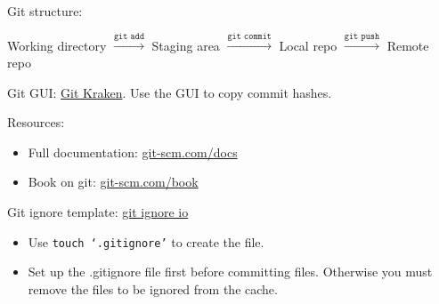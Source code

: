 \documentclass[12pt]{article}
\newcommand{\code}[1]{\texttt{#1}}
\begin{document}
Git structure: 
\begin{center}
    Working directory $\overset{\code{git add}}{\longrightarrow}$ Staging area $\overset{\code{git commit}}{\longrightarrow}$  Local repo $\overset{\code{git push}}{\longrightarrow}$ Remote repo
\end{center}

Git GUI: \href{https://www.gitkraken.com}{Git Kraken}. Use the GUI to copy commit hashes.

Resources:
\begin{itemize}
    \item 
    Full documentation: \href{https://git-scm.com/docs/}{git-scm.com/docs}
    \item
    Book on git: \href{https://git-scm.com/book/en/v2}{git-scm.com/book}
\end{itemize}

Git ignore template: \href{https://www.toptal.com/developers/gitignore}{git ignore io}
\begin{itemize}
    \item 
    Use \code{touch `.gitignore'} to create the file.
    \item
    Set up the .gitignore file first before committing files. Otherwise you must remove the files to be ignored from the cache.
\end{itemize}
\end{document}
